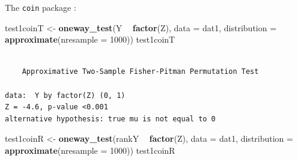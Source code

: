 \documentclass[
  12pt,
]{book}
\newenvironment{Shaded}{\begin{snugshade}}{\end{snugshade}}
\newcommand{\CommentTok}[1]{\textcolor[rgb]{0.56,0.35,0.01}{\textit{#1}}}
\newcommand{\DataTypeTok}[1]{\textcolor[rgb]{0.13,0.29,0.53}{#1}}
\newcommand{\DecValTok}[1]{\textcolor[rgb]{0.00,0.00,0.81}{#1}}
\newcommand{\KeywordTok}[1]{\textcolor[rgb]{0.13,0.29,0.53}{\textbf{#1}}}
\newcommand{\NormalTok}[1]{#1}
\newcommand{\OperatorTok}[1]{\textcolor[rgb]{0.81,0.36,0.00}{\textbf{#1}}}
\newcommand{\StringTok}[1]{\textcolor[rgb]{0.31,0.60,0.02}{#1}}
\theoremstyle{definition}
\theoremstyle{definition}
\theoremstyle{definition}
\theoremstyle{remark}
\begin{document}
\begin{Shaded}
\end{Shaded}

The \texttt{coin} package \citep{R-coin}:

\begin{Shaded}
\begin{Highlighting}[]
\NormalTok{test1coinT <-}\StringTok{ }\KeywordTok{oneway_test}\NormalTok{(Y }\OperatorTok{~}\StringTok{ }\KeywordTok{factor}\NormalTok{(Z), }\DataTypeTok{data =}\NormalTok{ dat1, }\DataTypeTok{distribution =} \KeywordTok{approximate}\NormalTok{(}\DataTypeTok{nresample =} \DecValTok{1000}\NormalTok{))}
\NormalTok{test1coinT}
\end{Highlighting}
\end{Shaded}

\begin{verbatim}

    Approximative Two-Sample Fisher-Pitman Permutation Test

data:  Y by factor(Z) (0, 1)
Z = -4.6, p-value <0.001
alternative hypothesis: true mu is not equal to 0
\end{verbatim}

\begin{Shaded}
\begin{Highlighting}[]
\NormalTok{test1coinR <-}\StringTok{ }\KeywordTok{oneway_test}\NormalTok{(rankY }\OperatorTok{~}\StringTok{ }\KeywordTok{factor}\NormalTok{(Z), }\DataTypeTok{data =}\NormalTok{ dat1, }\DataTypeTok{distribution =} \KeywordTok{approximate}\NormalTok{(}\DataTypeTok{nresample =} \DecValTok{1000}\NormalTok{))}
\NormalTok{test1coinR}
\end{Highlighting}
\end{Shaded}
\end{document}
